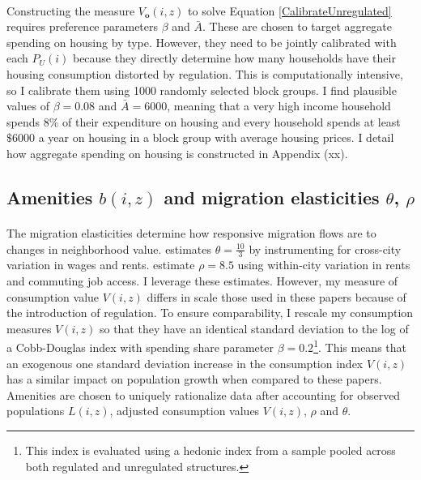 \documentclass[11pt]{article}
\begin{document}
\paragraph*{}
Constructing the measure $V_{\boldsymbol{o}}(i, z)$ to solve Equation \eqref{CalibrateUnregulated} requires preference parameters $\beta$ and $\bar{A}$. These are chosen to target aggregate spending on housing by type. However, they need to be jointly calibrated with each $P_{U}(i)$ because they directly determine how many households have their housing consumption distorted by regulation. This is computationally intensive, so I calibrate them using 1000 randomly selected block groups. I find plausible values of $\beta = 0.08$ and $\bar{A} = 6000$, meaning that a very high income household spends $8\%$ of their expenditure on housing and every household spends at least $\$6000$ a year on housing in a block group with average housing prices. I detail how aggregate spending on housing is constructed in Appendix (xx). 


\subsection{Amenities $b(i, z)$ and migration elasticities $\theta$, $\rho$} 
\paragraph*{}
The migration elasticities determine how responsive migration flows are to changes in neighborhood value. \cite{morettihornbeck} estimates $\theta = \frac{10}{3}$ by instrumenting for cross-city variation in wages and rents. \cite{BSH} estimate $\rho = 8.5$ using within-city variation in rents and commuting job access. I leverage these estimates. However, my measure of consumption value $V(i, z)$ differs in scale those used in these papers because of the introduction of regulation. To ensure comparability, I rescale my consumption measures $V(i, z)$ so that they have an identical standard deviation to the log of a Cobb-Douglas index with spending share parameter $\beta = 0.2$\footnote{This index is evaluated using a hedonic index from a sample pooled across both regulated and unregulated structures.}. This means that an exogenous one standard deviation increase in the consumption index $V(i, z)$ has a similar impact on population growth when compared to these papers. Amenities are chosen to uniquely rationalize data after accounting for observed populations $L(i, z)$, adjusted consumption values $V(i, z)$, $\rho$ and $\theta$. 
\end{document}
